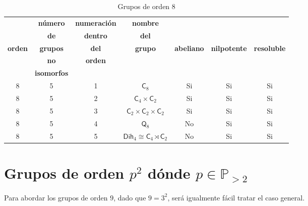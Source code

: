 \documentclass[12pt,a4paper,fleqn,spanish,final,openright]{extbook}
\theoremstyle{definition}
\theoremstyle{remark}
\begin{document}
\begin{table}[h!]
    \begin{center}
        \caption{Grupos de orden $8$}
        \label{tab:GruposOrden2p}
        \begin{tabular}{c|c|c|c|c|c|c} %
            \textbf{} & \tiny\textbf{número} &\tiny\textbf{numeración} & \tiny\textbf{nombre} & \textbf{} & {} & {} \\
            \textbf{} & \tiny\textbf{de} &\tiny\textbf{dentro} & \tiny\textbf{del} & \tiny\textbf{} & {} & {} \\
            \tiny\textbf{orden} & \tiny\textbf{grupos} & \tiny\textbf{del} & \tiny\textbf{grupo} & \tiny\textbf{abeliano}  & \tiny\textbf{nilpotente} & \tiny\textbf{resoluble} \\
            \textbf{} & \tiny\textbf{no} & \tiny\textbf{orden} & \textbf{} & \textbf{} & {} & {} \\
            \textbf{} & \tiny\textbf{isomorfos} &\textbf{} & \textbf{} & \textbf{} & {} & {} \\
            \hline
            8 & 5 & 1 & ${\textsf{C}}_{8}$ & Si & Si & Si \\
            \hline
            8 & 5 & 2  & ${{\textsf{C}}_{4}}   \times   {{\textsf{C}}_{2}}$ & Si & Si & Si \\
            \hline
            8 & 5 & 3 & ${{\textsf{C}}_{2}}   \times   {{\textsf{C}}_{2}}   \times   {{\textsf{C}}_{2}}$ & Si & Si & Si \\
            \hline
            8 & 5 & 4  & ${{\textsf{Q}}_{8}}$ & No & Si & Si \\
            \hline
            8 & 5 & 5 & ${{\textsf{Dih}}_{4}}     \cong     {{\textsf{C}}_{4}}\rtimes{{{\textsf{C}}_{2}}}$ & No & Si & Si \\
            \hline
        \end{tabular}
    \end{center}
\end{table}



\chapter{Grupos de orden $p^2$ dónde $p    \in {\mathds{P}}_{>2}$}


Para abordar los grupos de orden $9$, dado que $9=3^2$, será igualmente fácil tratar el caso general.
\end{document}
